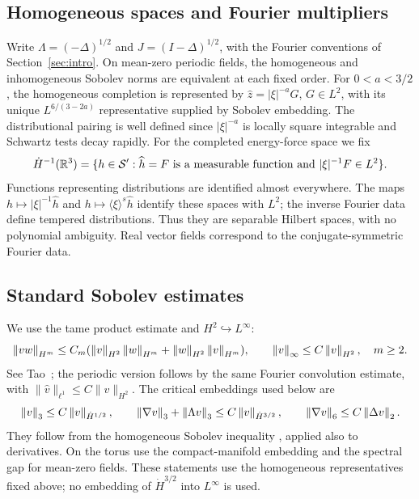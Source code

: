 \subsection{Homogeneous spaces and Fourier multipliers}
Write $\Lambda=(-\Delta)^{1/2}$ and $J=(I-\Delta)^{1/2}$, with the
Fourier conventions of Section~\ref{sec:intro}. On mean-zero periodic
fields, the homogeneous and inhomogeneous Sobolev norms are equivalent
at each fixed order. For $0<a<3/2$, the homogeneous completion is represented by
$\widehat z=|\xi|^{-a}G$, $G\in L^2$, with its unique
$L^{6/(3-2a)}$ representative supplied by Sobolev embedding.
The distributional pairing is well defined since $|\xi|^{-a}$ is locally
square integrable and Schwartz tests decay rapidly.
For the completed energy-force space we fix
\begin{equation}\label{eq:homogeneous-realization}
 \dot H^{-1}(\mathbb R^3)=\{h\in\mathcal S':\widehat h=F
 \text{ is a measurable function and }|\xi|^{-1}F\in L^2\}.
\end{equation}
Functions representing distributions are identified almost everywhere.
The maps $h\mapsto|\xi|^{-1}\widehat h$ and
$h\mapsto\langle\xi\rangle^s\widehat h$ identify these spaces with $L^2$;
the inverse Fourier data define tempered distributions. Thus they are
separable Hilbert spaces, with no polynomial ambiguity. Real vector fields
correspond to the conjugate-symmetric Fourier data.

\subsection{Standard Sobolev estimates}\label{sec:sobolev-estimates}
We use the tame product estimate and $H^2\hookrightarrow L^\infty$:
\begin{equation}\label{eq:Rproduct}
 \left\lVert vw\right\rVert_{H^m}\le C_m(\left\lVert v\right\rVert_{H^2}\left\lVert w\right\rVert_{H^m}
              +\left\lVert w\right\rVert_{H^2}\left\lVert v\right\rVert_{H^m}),\qquad
 \left\lVert v\right\rVert_\infty\le C\left\lVert v\right\rVert_{H^2},\quad m\ge2.
\end{equation}
See Tao~\cite[Appendix~A, (A.13), Lemma~A.8]{taodispersive}; the periodic
version follows by the same Fourier convolution estimate, with
$\|\widehat v\|_{\ell^1}\le C\|v\|_{H^2}$. The critical embeddings used below are
\begin{equation}\label{eq:embeddings}
 \left\lVert v\right\rVert_3\le C\left\lVert v\right\rVert_{\dot H^{1/2}},\qquad
 \left\lVert\nabla v\right\rVert_3+\left\lVert\Lambda v\right\rVert_3\le C\left\lVert v\right\rVert_{\dot H^{3/2}},\qquad
 \left\lVert\nabla v\right\rVert_6\le C\left\lVert\Delta v\right\rVert_2.
\end{equation}
They follow from the homogeneous Sobolev inequality
\cite[Appendix~A, (A.11)]{taodispersive}, applied also to derivatives.
On the torus use the compact-manifold embedding
\cite[Chapter~13, Proposition~6.4 and preceding discussion]{taylor2011iii}
and the spectral gap for mean-zero fields. These statements use the
homogeneous representatives fixed above; no embedding of $\dot H^{3/2}$
into $L^\infty$ is used.

